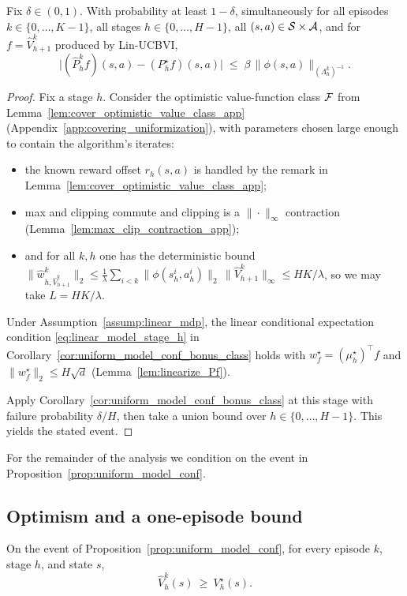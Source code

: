 \begin{proposition}\label{prop:uniform_model_conf}
Fix $\delta\in(0,1)$.  With probability at least $1-\delta$, simultaneously for all
episodes $k\in\{0,\dots,K-1\}$, all stages $h\in\{0,\dots,H-1\}$, all $(s,a)\in\mathcal{S}\times\mathcal{A}$,
and for $f=\widehat V_{h+1}^k$ produced by Lin-UCBVI,
\[
\big|(\widehat P_h^k f)(s,a) - (P_h^\star f)(s,a)\big|
\;\le\;
\beta\,\|\phi(s,a)\|_{(\Lambda_h^k)^{-1}}.
\]
\end{proposition}

\begin{proof}
Fix a stage $h$.  Consider the optimistic value-function class $\mathcal{F}$ from
Lemma~\ref{lem:cover_optimistic_value_class_app} (Appendix~\ref{app:covering_uniformization}),
with parameters chosen large enough to contain the algorithm's iterates:
\begin{itemize}
\item the known reward offset $r_h(s,a)$ is handled by the remark in
Lemma~\ref{lem:cover_optimistic_value_class_app};
\item max and clipping commute and clipping is a $\|\cdot\|_\infty$ contraction
(Lemma~\ref{lem:max_clip_contraction_app});
\item and for all $k,h$ one has the deterministic bound
$\|\widehat w_{h,\widehat V_{h+1}^k}^k\|_2 \le \frac{1}{\lambda}\sum_{i<k}\|\phi(s_h^i,a_h^i)\|_2\,
\|\widehat V_{h+1}^k\|_\infty \le HK/\lambda$, so we may take $L=HK/\lambda$.
\end{itemize}
Under Assumption~\ref{assump:linear_mdp}, the linear conditional expectation condition
\eqref{eq:linear_model_stage_h} in Corollary~\ref{cor:uniform_model_conf_bonus_class} holds with
$w_f^\star=(\mu_h^\star)^\top f$ and $\|w_f^\star\|_2\le H\sqrt d$ (Lemma~\ref{lem:linearize_Pf}).

Apply Corollary~\ref{cor:uniform_model_conf_bonus_class} at this stage with failure probability
$\delta/H$, then take a union bound over $h\in\{0,\dots,H-1\}$.  This yields the stated event.
\end{proof}

For the remainder of the analysis we condition on the event in
Proposition~\ref{prop:uniform_model_conf}.

\subsection{Optimism and a one-episode bound}

\begin{lemma}[Optimism]\label{lem:ucbvi_lin_optimism}
On the event of Proposition~\ref{prop:uniform_model_conf}, for every episode $k$, stage $h$,
and state $s$,
\[
\widehat V_h^k(s)\ \ge\ V_h^\star(s).
\]
\end{lemma}

